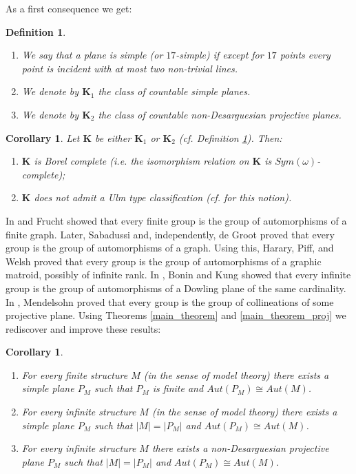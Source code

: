 \documentclass{amsart}
\newtheorem{corollary}[theorem]{Corollary}
\newtheorem{definition}[theorem]{Definition}
\numberwithin{claimcounter}{theorem}
\begin{document}
	As a first consequence we get:
	
		\begin{definition}\label{def_classes}
	\begin{enumerate}[(1)]
	\item We say that a plane is simple (or $17$-simple) if except for $17$ points every point is incident with at most two non-trivial lines.
	\item We denote by $\mathbf{K}_1$ the class of countable simple planes.
	\item We denote by $\mathbf{K}_2$ the class of countable non-Desarguesian projective planes.
\end{enumerate}
\end{definition}

\begin{corollary}\label{main_cor2} Let $\mathbf{K}$ be either $\mathbf{K}_1$ or $\mathbf{K}_2$ (cf. Definition \ref{def_classes}). Then:
\begin{enumerate}[(1)]
	\item $\mathbf{K}$ is Borel complete (i.e. the isomorphism relation on $\mathbf{K}$ is $Sym(\omega)$-complete);
	\item $\mathbf{K}$ does not admit a Ulm type classification (cf. \cite{ulm_inv_paper} for this notion).
\end{enumerate}
\end{corollary}

	In \cite{frucht} and \cite{frucht2} Frucht showed that every finite group is the group of automorphisms of a finite graph. Later, Sabadussi \cite{sabi} and, independently, de Groot \cite{groot} proved that every group is the group of automorphisms of a graph. Using this, Harary, Piff, and Welsh \cite{piff} proved that every group is the group of automorphisms of a graphic matroid, possibly of infinite rank. In \cite{bonin}, Bonin and Kung showed that every infinite group is the group of automorphisms of a Dowling plane of the same cardinality. In \cite{projective}, Mendelsohn proved that every group is the group of collineations of some projective plane. Using Theorems \ref{main_theorem} and \ref{main_theorem_proj} we rediscover and improve these results:

	\begin{corollary}\label{main_cor} 
	\begin{enumerate}[(1)]
	\item For every finite structure $M$ (in the sense of model theory) there exists a simple plane $P_M$ such that $P_M$ is finite and $Aut(P_M) \cong Aut(M)$.
	\item For every infinite structure $M$ (in the sense of model theory) there exists a simple plane $P_M$ such that $|M| = |P_M|$ and $Aut(P_M) \cong Aut(M)$.
	\item For every infinite structure $M$ there exists a non-Desarguesian projective plane $P_M$ such that $|M| = |P_M|$ and $Aut(P_M) \cong Aut(M)$.
\end{enumerate}	
\end{corollary}
\end{document}
